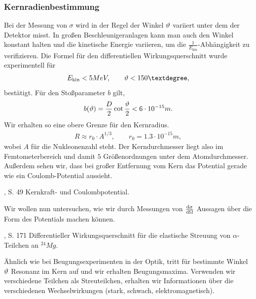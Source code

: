 \subsubsection{Kernradienbestimmung}
Bei der Messung von $\sigma$ wird in der Regel der Winkel $\vartheta$ variiert unter
dem der Detektor misst. In großen Beschleunigeranlagen kann man auch den Winkel
konstant halten und die kinetische Energie variieren, um die
$\frac{1}{E_\text{kin}}$-Abhängigkeit zu verifizieren. Die Formel für den
differentiellen Wirkungsquerschnitt wurde experimentell für
\begin{align*}
E_\text{kin} < 5MeV,\qquad \th<150°,
\end{align*}
bestätigt. Für den Stoßparameter $b$ gilt,
\begin{align*}
b(\vartheta) = \frac{D}{2}\cot\frac{\vartheta}{2} < 6\cdot 10^{-15}m.
\end{align*}
Wir erhalten so eine obere Grenze für den Kernradius.
\begin{align*}
R \approx r_0\cdot A^{1/3},\qquad r_0 = 1.3\cdot 10^{-15}m,
\end{align*}
wobei $A$ für die Nukleonenzahl steht. Der Kerndurchmesser liegt also im
Femtometerbereich und damit $5$ Größenordnungen unter dem Atomdurchmesser.
Außerdem sehen wir, dass bei großer Entfernung vom Kern das Potential gerade
wie ein Coulomb-Potential aussieht.

%
	{\HakenWolf, S. 49}%
	{Kernkraft- und Coulombpotential.}

Wir wollen nun untersuchen, wie wir durch Messungen von
$\frac{\mathrm{d}\sigma}{\mathrm{d}\Omega}$ Aussagen über die Form des Potentials machen
können.

%
	{\FrauenfelderHenley, S. 171}%
	{Differentieller Wirkungsquerschnitt für die elastische Streuung von
	$\alpha$-Teilchen an ${}^{24}Mg$.}

Ähnlich wie bei Beugungsexperimenten in der Optik, tritt für bestimmte Winkel
$\vartheta$ Resonanz im Kern auf und wir erhalten Beugungsmaxima. Verwenden wir verschiedene Teilchen als
Streuteilchen, erhalten wir Informationen über die verschiedenen
Wechselwirkungen (stark, schwach, elektromagnetisch).

